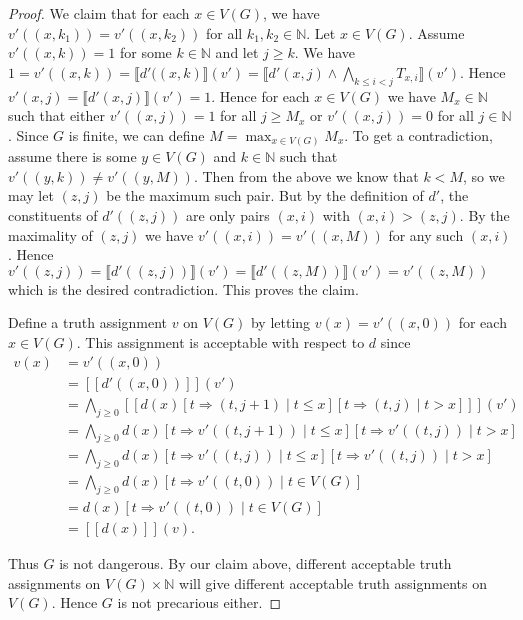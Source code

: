 \documentclass[12pt]{article}
\theoremstyle{remark}
\begin{document}
\begin{proof}
We claim that for each $x \in V(G)$, we have $v'((x, k_1)) = v'((x, k_2))$ for all $k_1, k_2 \in \mathbb{N}$.  Let $x \in V(G)$.  Assume $v'((x, k)) = 1$ for some $k \in \mathbb{N}$ and let $j \geq k$. We have $1 = v'((x,k)) = \llbracket d'((x,k)\rrbracket(v') = \llbracket d'(x, j) \wedge \bigwedge_{k \leq i < j} T_{x, i}\rrbracket(v')$.  Hence $v'(x, j) = \llbracket d'(x, j)\rrbracket(v') = 1$. Hence for each $x \in V(G)$ we have $M_x \in \mathbb{N}$ such that either $v'((x , j)) = 1$ for all $j \geq M_x$ or $v'((x, j)) = 0$ for all $j \in \mathbb{N}$.  Since $G$ is finite, we can define $M = \max_{x \in V(G)} M_x$.  To get a contradiction, assume there is some $y \in V(G)$ and $k \in \mathbb{N}$ such that $v'((y, k)) \neq v'((y, M))$.  Then from the above we know that $k < M$, so we may let $(z, j)$ be the maximum such pair.  But by the definition of $d'$, the constituents of $d'((z, j))$ are only pairs $(x, i)$ with $(x, i) > (z, j)$.  By the maximality of $(z, j)$ we have $v'((x, i)) = v'((x, M))$ for any such $(x, i)$.  Hence $v'((z, j)) = \llbracket d'((z, j)) \rrbracket (v') = \llbracket d'((z, M)) \rrbracket (v') = v'((z, M))$ which is the desired contradiction. This proves the claim.\newline

Define a truth assignment $v$ on $V(G)$ by letting $v(x) = v'((x,0))$ for each $x \in V(G)$. This assignment is acceptable with respect to $d$ since
\begin{align*}
v(x) &= v'((x, 0)) \\
&= [[d'((x, 0))]](v') \\
&= \bigwedge_{j \geq 0} [[d(x)[t \Rightarrow (t, j + 1) \mid t \leq x][t \Rightarrow (t, j) \mid t > x]]](v') \\
&= \bigwedge_{j \geq 0} d(x)[t \Rightarrow v'((t, j + 1)) \mid t \leq x][t \Rightarrow v'((t, j)) \mid t > x] \\
&= \bigwedge_{j \geq 0} d(x)[t \Rightarrow v'((t, j)) \mid t \leq x][t \Rightarrow v'((t, j)) \mid t > x] \\
&= \bigwedge_{j \geq 0} d(x)[t \Rightarrow v'((t, 0)) \mid t \in V(G)] \\
&= d(x)[t \Rightarrow v'((t, 0)) \mid t \in V(G)] \\
&= [[d(x)]](v).
\end{align*}

Thus $G$ is not dangerous. By our claim above, different acceptable truth assignments on $V(G) \times \mathbb{N}$ will give different acceptable truth assignments on $V(G)$.  Hence $G$ is not precarious either.
\end{proof}
\end{document}
